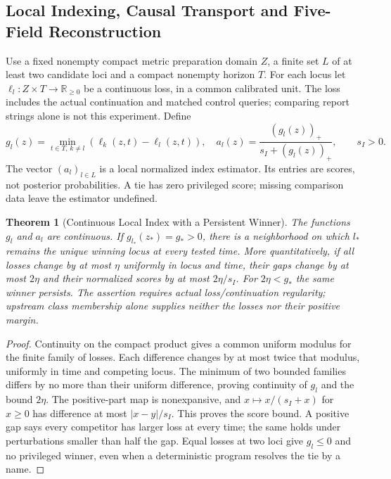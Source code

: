 \documentclass[11pt,a4paper]{article}
\newtheorem{theorem}{Theorem}[section]
\theoremstyle{definition}
\begin{document}
\subsection{Local Indexing, Causal Transport and Five-Field Reconstruction}

Use a fixed nonempty compact metric preparation domain $Z$, a finite set
$L$ of at least two candidate loci and a compact nonempty horizon $T$.
For each locus let $\ell_l:Z\times T\to\mathbb R_{\ge0}$ be a continuous
loss, in a common calibrated unit. The loss includes the actual continuation
and matched control queries; comparing report strings alone is not this
experiment. Define
\[
 g_l(z)=\min_{t\in T,\,k\ne l}(\ell_k(z,t)-\ell_l(z,t)),\quad
 a_l(z)=\frac{(g_l(z))_+}{s_I+(g_l(z))_+},\qquad s_I>0.
\]
The vector $(a_l)_{l\in L}$ is a local normalized index estimator. Its entries
are scores, not posterior probabilities. A tie has zero privileged score;
missing comparison data leave the estimator undefined.

\begin{theorem}[Continuous Local Index with a Persistent Winner]
\label{thm:selfindex-emergence}
The functions $g_l$ and $a_l$ are continuous. If $g_{l_*}(z_*)=g_*>0$,
there is a neighborhood on which $l_*$ remains the unique winning locus at
every tested time. More quantitatively, if all losses change by at most
$\eta$ uniformly in locus and time, their gaps change by at most $2\eta$
and their normalized scores by at most $2\eta/s_I$. For $2\eta<g_*$ the
same winner persists. The assertion requires actual loss/continuation
regularity; upstream class membership alone supplies neither the losses nor
their positive margin.
\end{theorem}
\begin{proof}
Continuity on the compact product gives a common uniform modulus for the
finite family of losses. Each difference changes by at most twice that
modulus, uniformly in time and competing locus. The minimum of two bounded
families differs by no more than their uniform difference, proving continuity
of $g_l$ and the bound $2\eta$. The positive-part map is nonexpansive, and
$x\mapsto x/(s_I+x)$ for $x\ge0$ has difference at most $|x-y|/s_I$.
This proves the score bound. A positive gap says every competitor has larger
loss at every time; the same holds under perturbations smaller than half the
gap. Equal losses at two loci give $g_l\le0$ and no privileged winner, even
when a deterministic program resolves the tie by a name.
\end{proof}
\end{document}
